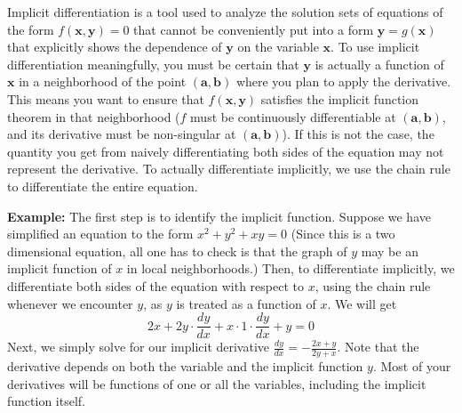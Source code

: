 \documentclass[12pt]{article}
\begin{document}
Implicit differentiation is a tool used to analyze the solution sets of equations of the form $f(\mathbf{x}, \mathbf{y}) = 0$ that cannot be conveniently put into a form $\mathbf{y}=g(\mathbf{x})$ that explicitly shows the dependence of $\mathbf{y}$ on the variable $\mathbf{x}$. To use implicit differentiation meaningfully, you must be certain that $\mathbf{y}$ is actually a function of $\mathbf{x}$ in a neighborhood of the point $(\mathbf{a}, \mathbf{b})$ where you plan to apply the derivative. This means you want to ensure that $f(\mathbf{x}, \mathbf{y})$ satisfies the implicit function theorem in that neighborhood ($f$ must be continuously differentiable at $(\mathbf{a}, \mathbf{b})$, and its derivative must be non-singular at $(\mathbf{a}, \mathbf{b})$). If this is not the case, the quantity you get from naively differentiating both sides of the equation may not represent the derivative. To actually differentiate implicitly, we use the chain rule to differentiate the entire equation.

\textbf{Example:} The first step is to identify the implicit function. Suppose we have simplified an equation to the form $x^2 + y^2 + xy =0$ (Since this is a two dimensional equation, all one has to check is that the graph of $y$ may be an implicit function of $x$ in local neighborhoods.) Then, to differentiate implicitly, we differentiate both sides of the equation with respect to $x$, using the chain rule whenever we encounter $y$, as $y$ is treated as a function of $x$. We will get
$$2x + 2y\cdot \frac{dy}{dx} + x\cdot 1\cdot\frac{dy}{dx} + y = 0$$
Next, we simply solve for our implicit derivative $\frac{dy}{dx}=-\frac{2x+y}{2y+x}$. Note that the derivative depends on both the variable and the implicit function $y$. Most of your derivatives will be functions of one or all the variables, including the implicit function itself.

\end{document}
